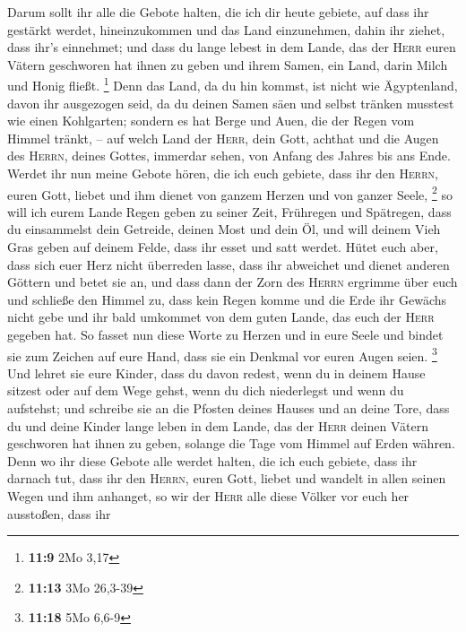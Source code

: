  Darum sollt ihr alle die Gebote halten, die ich dir heute
gebiete, auf dass ihr gestärkt werdet, hineinzukommen und das Land
einzunehmen, dahin ihr ziehet, dass ihr's einnehmet;  und
dass du lange lebest in dem Lande, das der \textsc{Herr} euren Vätern
geschworen hat ihnen zu geben und ihrem Samen, ein Land, darin Milch und
Honig fließt. \footnote{\textbf{11:9} 2Mo 3,17}  Denn das
Land, da du hin kommst, ist nicht wie Ägyptenland, davon ihr ausgezogen
seid, da du deinen Samen säen und selbst tränken musstest wie einen
Kohlgarten;  sondern es hat Berge und Auen, die der Regen
vom Himmel tränkt, --  auf welch Land der \textsc{Herr},
dein Gott, achthat und die Augen des \textsc{Herrn}, deines Gottes,
immerdar sehen, von Anfang des Jahres bis ans Ende. 
Werdet ihr nun meine Gebote hören, die ich euch gebiete, dass ihr den
\textsc{Herrn}, euren Gott, liebet und ihm dienet von ganzem Herzen und
von ganzer Seele, \footnote{\textbf{11:13} 3Mo 26,3-39} 
so will ich eurem Lande Regen geben zu seiner Zeit, Frühregen und
Spätregen, dass du einsammelst dein Getreide, deinen Most und dein Öl,
 und will deinem Vieh Gras geben auf deinem Felde, dass
ihr esset und satt werdet.  Hütet euch aber, dass sich
euer Herz nicht überreden lasse, dass ihr abweichet und dienet anderen
Göttern und betet sie an,  und dass dann der Zorn des
\textsc{Herrn} ergrimme über euch und schließe den Himmel zu, dass kein
Regen komme und die Erde ihr Gewächs nicht gebe und ihr bald umkommet
von dem guten Lande, das euch der \textsc{Herr} gegeben hat.
 So fasset nun diese Worte zu Herzen und in eure Seele
und bindet sie zum Zeichen auf eure Hand, dass sie ein Denkmal vor euren
Augen seien. \footnote{\textbf{11:18} 5Mo 6,6-9}  Und
lehret sie eure Kinder, dass du davon redest, wenn du in deinem Hause
sitzest oder auf dem Wege gehst, wenn du dich niederlegst und wenn du
aufstehst;  und schreibe sie an die Pfosten deines Hauses
und an deine Tore,  dass du und deine Kinder lange leben
in dem Lande, das der \textsc{Herr} deinen Vätern geschworen hat ihnen
zu geben, solange die Tage vom Himmel auf Erden währen. 
Denn wo ihr diese Gebote alle werdet halten, die ich euch gebiete, dass
ihr darnach tut, dass ihr den \textsc{Herrn}, euren Gott, liebet und
wandelt in allen seinen Wegen und ihm anhanget,  so wir
der \textsc{Herr} alle diese Völker vor euch her ausstoßen, dass ihr
